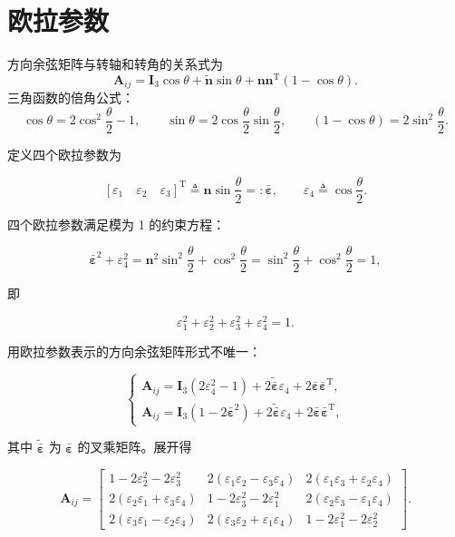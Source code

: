 \section{欧拉参数}
方向余弦矩阵与转轴和转角的关系式为
\[
\boldsymbol{A}_{ij}=\boldsymbol{I}_3\cos\theta+\tilde{\boldsymbol{n}}\sin\theta+\boldsymbol{n}\boldsymbol{n}^{\mathrm{T}}(1-\cos\theta).
\]
三角函数的倍角公式：
\[
\cos\theta=2\cos^2\frac{\theta}{2}-1,\qquad
\sin\theta=2\cos\frac{\theta}{2}\sin\frac{\theta}{2},\qquad
(1-\cos\theta)=2\sin^2\frac{\theta}{2}.
\]
\begin{definition}[欧拉参数]
定义四个欧拉参数为

\[
\left[\varepsilon_1\quad\varepsilon_2\quad\varepsilon_3\right]^{\mathrm{T}}\triangleq\boldsymbol{n}\sin\frac{\theta}{2}=:\bar{\boldsymbol{\varepsilon}},\qquad
\varepsilon_4\triangleq\cos\frac{\theta}{2}.
\]

四个欧拉参数满足模为 1 的约束方程：

\[
\bar{\boldsymbol{\varepsilon}}^2+\varepsilon_4^2=\boldsymbol{n}^2\sin^2\frac{\theta}{2}+\cos^2\frac{\theta}{2}=\sin^2\frac{\theta}{2}+\cos^2\frac{\theta}{2}=1,
\]

即

\[
\varepsilon_1^2+\varepsilon_2^2+\varepsilon_3^2+\varepsilon_4^2=1.
\]
\end{definition}
用欧拉参数表示的方向余弦矩阵形式不唯一：
\begin{theorem}[欧拉参数表示的方向余弦矩阵]
\[
\begin{cases}
\boldsymbol{A}_{ij}=\boldsymbol{I}_3(2\varepsilon_4^2-1)+2\tilde{\bar{\boldsymbol{\varepsilon}}}\varepsilon_4+2\bar{\boldsymbol{\varepsilon}}\bar{\boldsymbol{\varepsilon}}^{\mathrm{T}},\\
\boldsymbol{A}_{ij}=\boldsymbol{I}_3(1-2\bar{\boldsymbol{\varepsilon}}^2)+2\tilde{\bar{\boldsymbol{\varepsilon}}}\varepsilon_4+2\bar{\boldsymbol{\varepsilon}}\bar{\boldsymbol{\varepsilon}}^{\mathrm{T}},
\end{cases}
\]

其中 $\tilde{\bar{\boldsymbol{\varepsilon}}}$ 为 $\bar{\boldsymbol{\varepsilon}}$ 的叉乘矩阵。展开得

\[
\boldsymbol{A}_{ij}=
\begin{bmatrix}
1-2\varepsilon_2^2-2\varepsilon_3^2 & 2(\varepsilon_1\varepsilon_2-\varepsilon_3\varepsilon_4) & 2(\varepsilon_1\varepsilon_3+\varepsilon_2\varepsilon_4)\\
2(\varepsilon_2\varepsilon_1+\varepsilon_3\varepsilon_4) & 1-2\varepsilon_3^2-2\varepsilon_1^2 & 2(\varepsilon_2\varepsilon_3-\varepsilon_1\varepsilon_4)\\
2(\varepsilon_3\varepsilon_1-\varepsilon_2\varepsilon_4) & 2(\varepsilon_3\varepsilon_2+\varepsilon_1\varepsilon_4) & 1-2\varepsilon_1^2-2\varepsilon_2^2
\end{bmatrix}.
\]
\end{theorem}
